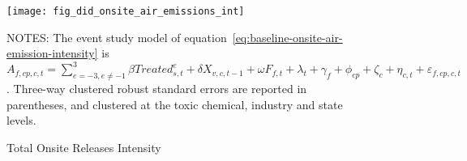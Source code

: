\begin{figure}[H]
    \centering
    \texttt{[image: fig\_did\_onsite\_air\_emissions\_int]}
    \caption{Total Onsite Releases Intensity}
    \label{fig:baseline-onsite-air-emission-intensity}
    \begin{minipage}{18cm}
        \vspace{0.05in}
        NOTES: The event study model of equation~\ref{eq:baseline-onsite-air-emission-intensity} is $A_{f,cp,c,t} = \sum_{{e = -3},{e \neq -1}}^{3} \beta Treated_{s,t}^e + \delta X_{v,c,t-1} + \omega F_{f,t} + \lambda_{t} + \gamma_{f} + \phi_{cp} + \zeta_{c} + \eta_{c,t} + \varepsilon_{f,cp,c,t}$. Three-way clustered robust standard errors are reported in parentheses, and clustered at the toxic chemical, industry and state levels.
    \end{minipage}
\end{figure}